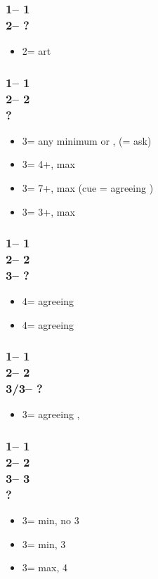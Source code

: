 \subsubsection*{1\hearts -- 1\spades\\
                2\hearts -- ?}
\begin{itemize}
    \item 2\nt = \invp art \vimp
\end{itemize}

\subsubsection*{1\hearts -- 1\spades\\
                2\hearts -- 2\nt\\
                ?}
\begin{itemize}
    \item 3\clubs = any minimum or \nat, \forc (\diams = ask) \vimp
    \item 3\diams = 4+\diams, max
    \item 3\hearts = 7+\hearts, max (cue = agreeing \hearts)
    \item 3\spades = 3+\spades, max
\end{itemize}

\subsubsection*{1\hearts -- 1\spades\\
                2\hearts -- 2\nt\\
                3\spades -- ?}
\begin{itemize}
    \item 4\clubs = agreeing \hearts
    \item 4\diams = agreeing \spades
\end{itemize}

\subsubsection*{1\hearts -- 1\spades\\
                2\hearts -- 2\nt\\
                3\clubs/3\diams -- ?}
\begin{itemize}
    \item 3\spades = agreeing \spades, \gf
\end{itemize}

\subsubsection*{1\hearts -- 1\spades\\
                2\hearts -- 2\nt\\
                3\clubs -- 3\diams\\
                ?}
\begin{itemize}
    \item 3\hearts = min, no 3\spades
    \item 3\spades = min, 3\spades
    \item 3\nt = max, 4\clubs
\end{itemize}

